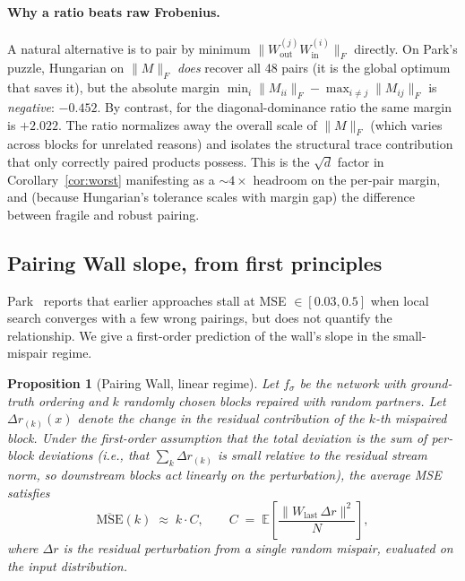 \documentclass[10pt]{article}
\newtheorem{proposition}{Proposition}
\theoremstyle{remark}
\begin{document}
\paragraph{Why a ratio beats raw Frobenius.} A natural alternative is
to pair by minimum $\|W_{\mathrm{out}}^{(j)} W_{\mathrm{in}}^{(i)}\|_F$
directly. On Park's puzzle, Hungarian on $\|M\|_F$ \emph{does} recover
all 48 pairs (it is the global optimum that saves it), but the absolute
margin
$\min_i \|M_{ii}\|_F - \max_{i\neq j} \|M_{ij}\|_F$
is \emph{negative}: $-0.452$. By contrast, for the diagonal-dominance
ratio the same margin is $+2.022$. The ratio normalizes away the
overall scale of $\|M\|_F$ (which varies across blocks for unrelated
reasons) and isolates the structural trace contribution that only
correctly paired products possess. This is the $\sqrt{d}$ factor in
Corollary~\ref{cor:worst} manifesting as a $\sim 4\times$ headroom on
the per-pair margin, and (because Hungarian's tolerance scales with
margin gap) the difference between fragile and robust pairing.

\subsection{Pairing Wall slope, from first principles}\label{sec:wall-theory}

Park~\cite[\S 5.1]{park2026} reports that earlier approaches stall at
MSE $\in[0.03, 0.5]$ when local search converges with a few wrong
pairings, but does not quantify the relationship. We give a
first-order prediction of the wall's slope in the small-mispair regime.

\begin{proposition}[Pairing Wall, linear regime]\label{prop:wall}
Let $f_\sigma$ be the network with ground-truth ordering and $k$
randomly chosen blocks repaired with random partners. Let
$\Delta r_{(k)}(x)$ denote the change in the residual contribution of
the $k$-th mispaired block. Under the first-order assumption that the
total deviation is the sum of per-block deviations (i.e., that
$\sum_k \Delta r_{(k)}$ is small relative to the residual stream norm,
so downstream blocks act linearly on the perturbation), the average
MSE satisfies
\[
  \overline{\mathrm{MSE}}(k) \;\approx\; k\cdot C,
  \qquad C \;=\; \mathbb{E}\!\left[\frac{\|W_{\mathrm{last}}\,\Delta r\|^2}{N}\right],
\]
where $\Delta r$ is the residual perturbation from a single random
mispair, evaluated on the input distribution.
\end{proposition}
\end{document}

